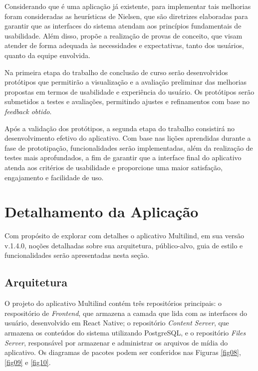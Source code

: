 Considerando que é uma aplicação já existente, para implementar tais melhorias foram consideradas as heurísticas de Nielsen, que são diretrizes elaboradas para garantir que as interfaces do sistema atendam aos princípios 
fundamentais de usabilidade. Além disso, propõe a realização de provas de conceito, que visam atender de forma adequada às necessidades e expectativas, tanto dos usuários, quanto da equipe envolvida.

Na primeira etapa do trabalho de conclusão de curso serão desenvolvidos protótipos que permitirão a visualização e a avaliação preliminar das melhorias propostas em termos de usabilidade e experiência do usuário. Os protótipos 
serão submetidos a testes e avaliações, permitindo ajustes e refinamentos com base no \textit{feedback obtido}. 

Após a validação dos protótipos, a segunda etapa do trabalho consistirá no desenvolvimento efetivo do aplicativo. Com base nas lições aprendidas durante a fase de prototipação, funcionalidades serão implementadas, além da realização 
de testes mais aprofundados, a fim de garantir que a interface final do aplicativo atenda aos critérios de usabilidade e proporcione uma maior satisfação, engajamento e facilidade de uso.

\section{Detalhamento da Aplicação}
\label{sec:Detalhamento da Aplicacao}
Com propósito de explorar com detalhes o aplicativo Multilind, em sua versão v.1.4.0, noções detalhadas sobre sua arquitetura, público-alvo, guia de estilo e funcionalidades serão apresentadas nesta seção. 	

\subsection{Arquitetura}
\label{Arquitetura}
O projeto do aplicativo Multilind contém três repositórios principais: o respositório de \textit{Frontend}, que armazena a camada que lida com as interfaces do usuário, desenvolvido em React Native; o repositório \textit{Content Server}, que armazena os conteúdos do sistema 
utilizando PostgreSQL, e o repositório \textit{Files Server}, responsável por armazenar e administrar os arquivos de mídia do aplicativo. Os diagramas de pacotes podem ser conferidos nas Figuras \ref{fig08}, \ref{fig09} e \ref{fig10}.

